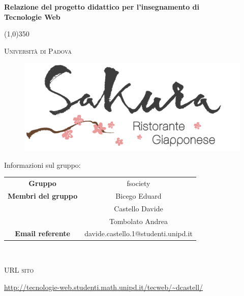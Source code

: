 \documentclass{article}
\author{Bicego Eduard, Castello Davide, Tombolato Andrea}
\date{01/02/2016}
\begin{document}
	\begin{titlepage}
		\centering
	{\huge\bfseries Relazione del progetto didattico per l'insegnamento di \\Tecnologie Web \par}

	\line(1,0){350} \\
	{\scshape\LARGE Università di Padova \par}
	\vspace{1cm}
	\hypersetup{
		colorlinks=true,
		linkcolor=blue,
		anchorcolor=black,
		citecolor=black,
		urlcolor=blue,
	}
	\begin{figure}[H]
	\centering
		\includegraphics[width=\textwidth]{images/logo}
	\end{figure}
	{\LARGE Informazioni sul gruppo:\par}
	\vspace{0.3cm}
	\begin{tabular}{c|c} 
		{\hfill\textbf{Gruppo}} 			&  fsociety  \\ 
		{\hfill\textbf{Membri del gruppo}} 			&  Bicego Eduard \\ 
										& Castello Davide       \\
										& Tombolato Andrea \\
		{\hfill\textbf{Email referente}} 		& davide.castello.1@studenti.unipd.it  	\\
	\end{tabular}\\
	\vspace{1.5cm}
	{\scshape\LARGE URL sito \par}
	\vspace{0.5cm}
	\large \url{http://tecnologie-web.studenti.math.unipd.it/tecweb/~dcastell/} \par
	\vspace{1cm}
	\end{titlepage}
\newpage
	\pagestyle{myfrontrel}
	\tableofcontents
\newpage
	\listoffigures
	\label{LastFrontPage}
\newpage
	\pagestyle{myrel}
	
\newpage
	
\newpage
	
\newpage
	
\newpage
	
\newpage
	
\label{LastPage}
\end{document}
